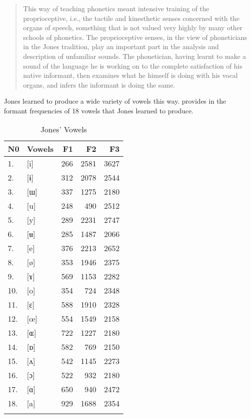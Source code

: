 \documentclass[output=paper,
modfonts
]{langscibook}
\begin{document}
\begin{quote}
{This way of teaching phonetics meant intensive training of the proprioceptive, i.e., the tactile and kinesthetic senses concerned with the organs of speech, something that is not valued very highly by many other schools of phonetics. The proprioceptive senses, in the view of phoneticians in the Jones tradition, play an important part in the analysis and description of unfamiliar sounds. The phonetician, having learnt to make a sound of the language he is working on to the complete satisfaction of his native informant, then examines what he himself is doing with his vocal organs, and infers the informant is doing the same.}
\end{quote}

{Jones learned to produce a wide variety of vowels this way. \citet[146]{Thomas2011} provides in  the formant frequencies of 18 vowels that Jones learned to produce.}

\begin{table}
\caption{Jones’ Vowels}
\label{tab:koffi:1}
\begin{tabularx}{.66\textwidth}{XXrrr}
\lsptoprule
N0 & Vowels & F1 & F2 & F3\\
\midrule
1. & [i] & 266 & 2581 & 3627\\
2. & [ɨ] & 312 & 2078 & 2544\\
3. & [ɯ] & 337 & 1275 & 2180\\
4. & [u] & 248 & 490 & 2512\\
5. & [y] & 289 & 2231 & 2747\\
6. & [ʉ] & 285 & 1487 & 2066\\
7. & [e] & 376 & 2213 & 2652\\
8. & [ø] & 353 & 1946 & 2375\\
9. & [ɤ] & 569 & 1153 & 2282\\
10. & [o] & 354 & 724 & 2348\\
11. & [ɛ] & 588 & 1910 & 2328\\
12. & [œ] & 554 & 1549 & 2158\\
13. & [ɶ] & 722 & 1227 & 2180\\
14. & [ɒ] & 582 & 769 & 2150\\
15. & [ʌ] & 542 & 1145 & 2273\\
16. & [ɔ] & 522 & 932 & 2180\\
17. & [ɑ] & 650 & 940 & 2472\\
18. & [a] & 929 & 1688 & 2354\\
\lspbottomrule
\end{tabularx}
\end{table}
\end{document}
